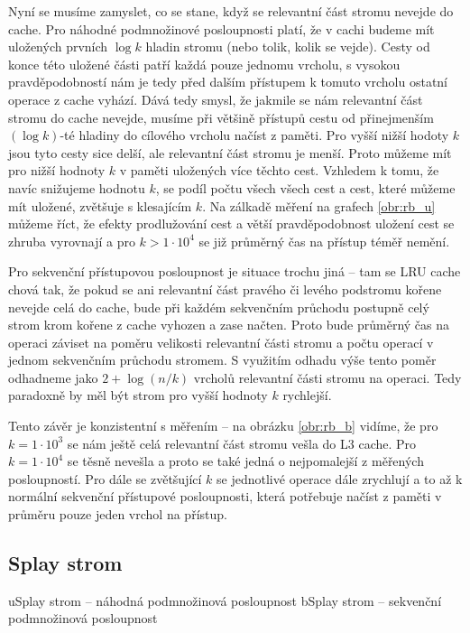 Nyní se musíme zamyslet, co se stane, když se relevantní část stromu nevejde do
cache. Pro náhodné podmnožinové posloupnosti platí, že v cachi budeme mít
uložených prvních $\log k$ hladin stromu (nebo tolik, kolik se vejde). Cesty od
konce této uložené části patří každá pouze jednomu vrcholu, s vysokou
pravděpodobností nám je tedy před dalším přístupem k tomuto vrcholu ostatní
operace z cache vyhází. Dává tedy smysl, že jakmile se nám relevantní část
stromu do cache nevejde, musíme při většině přístupů cestu od přinejmenším
$(\log k)$-té hladiny do cílového vrcholu načíst z paměti. Pro vyšší nižší
hodoty $k$ jsou tyto cesty sice delší, ale relevantní část stromu je menší.
Proto můžeme mít pro nižší hodnoty $k$ v paměti uložených více těchto cest.
Vzhledem k tomu, že navíc snižujeme hodnotu $k$, se podíl počtu všech všech
cest a cest, které můžeme mít uložené, zvětšuje s klesajícím $k$. Na zálkadě
měření na grafech \ref{obr:rb_u} můžeme říct, že efekty prodlužování cest a
větší pravděpodobnost uložení cest se zhruba vyrovnají a pro $k > 1\cdot 10^4$
se již průměrný čas na přístup téměř nemění.

Pro sekvenční přístupovou posloupnost je situace trochu jiná -- tam se LRU
cache chová tak, že pokud se ani relevantní část pravého či levého podstromu
kořene nevejde celá do cache, bude při každém sekvenčním průchodu postupně celý
strom krom kořene z cache vyhozen a zase načten. Proto bude průměrný čas na
operaci záviset na poměru velikosti relevantní části stromu a počtu operací v
jednom sekvenčním průchodu stromem. S využitím odhadu výše tento poměr
odhadneme jako $2 + \log(n/k)$ vrcholů relevantní části stromu na operaci. Tedy
paradoxně by měl být strom pro vyšší hodnoty $k$ rychlejší.

Tento závěr je konzistentní s měřením -- na obrázku \ref{obr:rb_b} vidíme, že pro $k=1\cdot10^3$ se nám
ještě celá relevantní část stromu vešla do L3 cache. Pro $k=1\cdot 10^4$ se
těsně nevešla a proto se také jedná o nejpomalejší z měřených posloupností. Pro
dále se zvětšující $k$ se jednotlivé operace dále zrychlují a to až k normální
sekvenční přístupové posloupnosti, která potřebuje načíst z paměti v průměru
pouze jeden vrchol na přístup. 

\subsection{Splay strom}

u{Splay strom -- náhodná podmnožinová posloupnost}
b{Splay strom -- sekvenční podmnožinová posloupnost}

